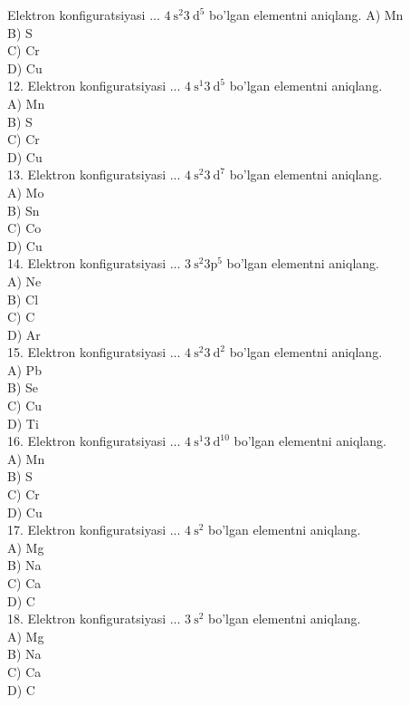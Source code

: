   \item Elektron konfiguratsiyasi ... $4 \mathrm{~s}^{2} 3 \mathrm{~d}^{5}$ bo'lgan elementni aniqlang.
A) Mn\\
B) S\\
C) Cr\\
D) Cu\\
12. Elektron konfiguratsiyasi ... $4 \mathrm{~s}^{1} 3 \mathrm{~d}^{5}$ bo'lgan elementni aniqlang.\\
A) Mn\\
B) S\\
C) Cr\\
D) Cu\\
13. Elektron konfiguratsiyasi ... $4 \mathrm{~s}^{2} 3 \mathrm{~d}^{7}$ bo'lgan elementni aniqlang.\\
A) Mo\\
B) Sn\\
C) Co\\
D) Cu\\
14. Elektron konfiguratsiyasi ... $3 \mathrm{~s}^{2} 3 \mathrm{p}^{5}$ bo'lgan elementni aniqlang.\\
A) Ne\\
B) Cl\\
C) C\\
D) Ar\\
15. Elektron konfiguratsiyasi ... $4 \mathrm{~s}^{2} 3 \mathrm{~d}^{2}$ bo'lgan elementni aniqlang.\\
A) Pb\\
B) Se\\
C) Cu\\
D) Ti\\
16. Elektron konfiguratsiyasi ... $4 \mathrm{~s}^{1} 3 \mathrm{~d}^{10}$ bo'lgan elementni aniqlang.\\
A) Mn\\
B) S\\
C) Cr\\
D) Cu\\
17. Elektron konfiguratsiyasi ... $4 \mathrm{~s}^{2}$ bo'lgan elementni aniqlang.\\
A) Mg\\
B) Na\\
C) Ca\\
D) C\\
18. Elektron konfiguratsiyasi ... $3 \mathrm{~s}^{2}$ bo'lgan elementni aniqlang.\\
A) Mg\\
B) Na\\
C) Ca\\
D) C\\
